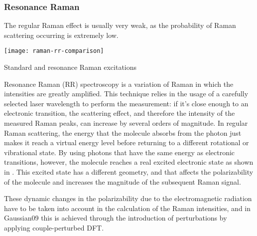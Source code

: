 \subsubsection{Resonance Raman}
The regular Raman effect is usually very weak, as the probability of Raman scattering occurring is extremely low.

\begin{marginfigure}
    \texttt{[image: raman-rr-comparison]}
    \caption[Standard and resonance Raman excitations]{Standard and resonance Raman excitations}
\end{marginfigure}

Resonance Raman (RR) spectroscopy is a variation of Raman in which the intensities are greatly amplified.
This technique relies in the usage of a carefully selected laser wavelength to perform the measurement: if it's close enough to an electronic transition, the scattering effect, and therefore the intensity of the measured Raman peaks, can increase by several orders of magnitude.
In regular Raman scattering, the energy that the molecule absorbs from the photon just makes it reach a virtual energy level before returning to a different rotational or vibrational state.
By using photons that have the same energy as electronic transitions, however, the molecule reaches a real excited electronic state as shown in .
This excited state has a different geometry, and that affects the polarizability of the molecule and increases the magnitude of the subsequent Raman signal.

These dynamic changes in the polarizability due to the electromagnetic radiation have to be taken into account in the calculation of the Raman intensities, and in Gaussian09 this is achieved through the introduction of perturbations by applying couple-perturbed DFT.

